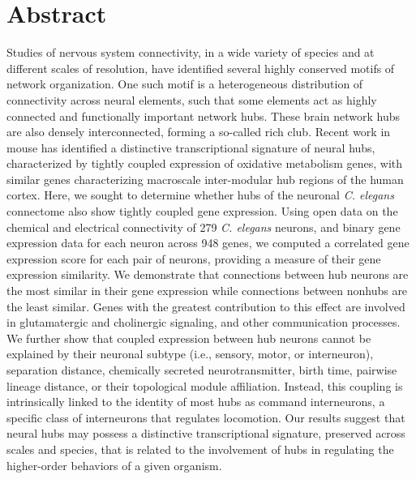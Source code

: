 \documentclass[10pt,letterpaper]{article}
\begin{document}
\section*{Abstract}
Studies of nervous system connectivity, in a wide variety of species and at different scales of resolution, have identified several highly conserved motifs of network organization.
One such motif is a heterogeneous distribution of connectivity across neural elements, such that some elements act as highly connected and functionally important network hubs.
These brain network hubs are also densely interconnected, forming a so-called rich club.
Recent work in mouse has identified a distinctive transcriptional signature of neural hubs, characterized by tightly coupled expression of oxidative metabolism genes, with similar genes characterizing macroscale inter-modular hub regions of the human cortex.
Here, we sought to determine whether hubs of the neuronal \textit{C. elegans} connectome also show tightly coupled gene expression.
Using open data on the chemical and electrical connectivity of 279 \textit{C. elegans} neurons, and binary gene expression data for each neuron across 948 genes, we computed a correlated gene expression score for each pair of neurons, providing a measure of their gene expression similarity.
We demonstrate that connections between hub neurons are the most similar in their gene expression while connections between nonhubs are the least similar.
Genes with the greatest contribution to this effect are involved in glutamatergic and cholinergic signaling, and other communication processes.
We further show that coupled expression between hub neurons cannot be explained by their neuronal subtype (i.e., sensory, motor, or interneuron), separation distance, chemically secreted neurotransmitter, birth time, pairwise lineage distance, or their topological module affiliation.
Instead, this coupling is intrinsically linked to the identity of most hubs as command interneurons, a specific class of interneurons that regulates locomotion.
Our results suggest that neural hubs may possess a distinctive transcriptional signature, preserved across scales and species, that is related to the involvement of hubs in regulating the higher-order behaviors of a given organism.
\end{document}
